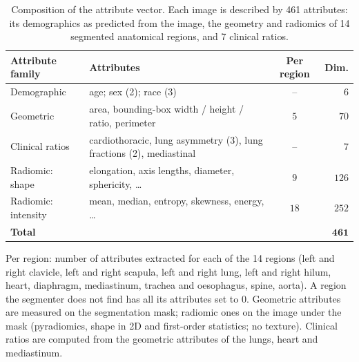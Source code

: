 \begin{table}[htbp]
\centering
\small
\caption{Composition of the attribute vector. Each image is described by 461 attributes: its demographics as predicted from the image, the geometry and radiomics of 14 segmented anatomical regions, and 7 clinical ratios.}
\label{tab:attribute_vector}
\begin{threeparttable}
\begin{tabular}{llcr}
\toprule
Attribute family & Attributes & Per region & Dim. \\
\midrule
Demographic & age; sex (2); race (3) & -- & $6$ \\
Geometric & area, bounding-box width / height / ratio, perimeter & $5$ & $70$ \\
Clinical ratios & cardiothoracic, lung asymmetry (3), lung fractions (2), mediastinal & -- & $7$ \\
Radiomic: shape & elongation, axis lengths, diameter, sphericity, \dots & $9$ & $126$ \\
Radiomic: intensity & mean, median, entropy, skewness, energy, \dots & $18$ & $252$ \\
\midrule
\textbf{Total} &  &  & $\mathbf{461}$ \\
\bottomrule
\end{tabular}
\begin{tablenotes}\footnotesize
\item Per region: number of attributes extracted for each of the 14 regions (left and right clavicle, left and right scapula, left and right lung, left and right hilum, heart, diaphragm, mediastinum, trachea and oesophagus, spine, aorta). A region the segmenter does not find has all its attributes set to $0$. Geometric attributes are measured on the segmentation mask; radiomic ones on the image under the mask (pyradiomics, shape in 2D and first-order statistics; no texture). Clinical ratios are computed from the geometric attributes of the lungs, heart and mediastinum.
\end{tablenotes}
\end{threeparttable}
\end{table}

